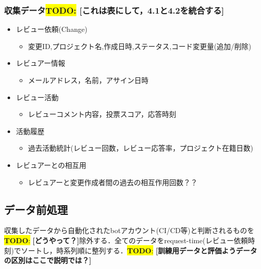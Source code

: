 \documentclass[submit,techrep,noauthor]{ipsj}
\newcommand{\todo}[1]{\colorbox{yellow}{{\bf TODO}:}{\color{red} {\textbf{[#1]}}}}
\begin{document}
\subsubsection{収集データ\todo{これは表にして，4.1と4.2を統合する}}
\begin{itemize}
    \item レビュー依頼(Change)
    \begin{itemize}
        \item 変更ID,プロジェクト名,作成日時,ステータス,コード変更量(追加/削除)
    \end{itemize}
\end{itemize}
\begin{itemize}
    \item レビュアー情報
    \begin{itemize}
        \item メールアドレス，名前，アサイン日時
    \end{itemize}
\end{itemize}
\begin{itemize}
    \item レビュー活動
    \begin{itemize}
        \item  レビューコメント内容，投票スコア，応答時刻
    \end{itemize}
\end{itemize}

\begin{itemize}
    \item 活動履歴
    \begin{itemize}
        \item  過去活動統計(レビュー回数，レビュー応答率，プロジェクト在籍日数)
    \end{itemize}
\end{itemize}
\begin{itemize}
    \item レビュアーとの相互用
    \begin{itemize}
        \item レビュアーと変更作成者間の過去の相互作用回数？？
    \end{itemize}
\end{itemize}

\subsection{データ前処理}
収集したデータから自動化されたbotアカウント(CI/CD等)と判断されるものを\todo{どうやって？}除外する．全てのデータをrequest-time(レビュー依頼時刻)でソートし，時系列順に整列する．\todo{訓練用データと評価ようデータの区別はここで説明では？}
\end{document}
